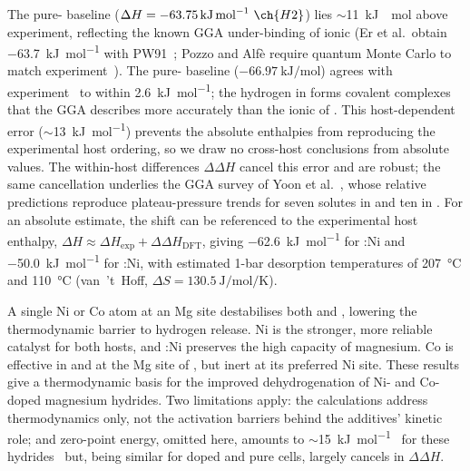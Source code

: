 \documentclass[11pt,a4paper]{article}
\begin{document}
The pure- baseline ($\Delta H =
\SI{-63.75}{\kilo\joule\per\mol}~\ch{H2}$) lies $\sim$\SI{11}{\kilo\joule
\per\mol} above experiment, reflecting the known GGA under-binding of ionic
 (Er et al.\ obtain \SI{-63.7}{\kilo\joule\per\mol} with
PW91~\cite{er2009}; Pozzo and Alf\`e require quantum Monte Carlo to match
experiment~\cite{pozzo2008}). The pure- baseline
($\SI{-66.97}{\kilo\joule\per\mol}$) agrees with experiment~\cite{reilly1968}
to within \SI{2.6}{\kilo\joule\per\mol}; the hydrogen in  forms
covalent  complexes~\cite{yoon2024} that the GGA describes
more accurately than the ionic  of . This host-dependent error
($\sim$\SI{13}{\kilo\joule\per\mol}) prevents the absolute enthalpies from
reproducing the experimental host ordering, so we draw no cross-host
conclusions from absolute values. The within-host differences $\Delta\Delta
H$ cancel this error and are robust; the same cancellation underlies the GGA
survey of Yoon et al.~\cite{yoon2024}, whose relative predictions reproduce
plateau-pressure trends for seven solutes in  and ten in
. For an absolute estimate, the shift can be referenced to the
experimental host enthalpy, $\Delta H \approx \Delta H_{\exp} + \Delta\Delta
H_{\mathrm{DFT}}$, giving \SI{-62.6}{\kilo\joule\per\mol} for :Ni and
\SI{-50.0}{\kilo\joule\per\mol} for :Ni, with estimated 1-bar
desorption temperatures of \SI{207}{\celsius} and \SI{110}{\celsius}
(van~'t~Hoff, $\Delta S = \SI{130.5}{\joule\per\mol\per\kelvin}$).

A single Ni or Co atom at an Mg site destabilises both  and
, lowering the thermodynamic barrier to hydrogen release. Ni
is the stronger, more reliable catalyst for both hosts, and :Ni
preserves the high capacity of magnesium. Co is effective in  and
at the Mg site of , but inert at its preferred Ni site. These
results give a thermodynamic basis for the improved dehydrogenation of Ni-
and Co-doped magnesium hydrides. Two limitations apply: the calculations
address thermodynamics only, not the activation barriers behind the
additives' kinetic role; and zero-point energy, omitted here, amounts to
$\sim$\SI{15}{\kilo\joule\per\mol}~ for these hydrides~\cite{er2009}
but, being similar for doped and pure cells, largely cancels in
$\Delta\Delta H$.



\end{document}
